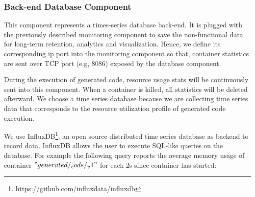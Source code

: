 \subsubsection{Back-end Database Component}
This component represents a times-series database back-end. It is plugged with the previously described monitoring component to save the non-functional data for long-term retention, analytics and visualization. Hence, we define its corresponding ip port into the monitoring component so that, container statistics are sent over TCP port (e.g, 8086) exposed by the database component.

During the execution of generated code, resource usage stats will be continuously sent into this component. When a container is killed, all statistics will be deleted afterward. We choose a time series database because we are collecting time series data that corresponds to the resource utilization profile of generated code execution.

We use InfluxDB\footnote{https://github.com/influxdata/influxdb}, an open source distributed time series database as backend to record data. InfluxDB allows the user to execute SQL-like queries on the database. For example the following query reports the average memory usage of container $"generated/_code/_v1"$ for each 2s since container has started:

